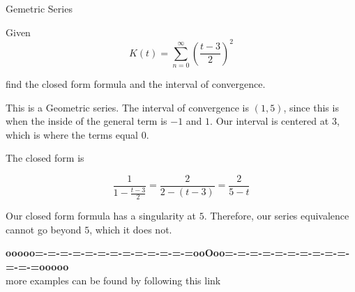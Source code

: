 \documentclass{ximera}
\begin{document}
\begin{example} Gemetric Series


Given 
\[    K(t) =   \sum_{n=0}^{\infty}  \left( \frac{t-3}{2} \right)^2\]

find the closed form formula and the interval of convergence.




\begin{explanation}


This is a Geometric series.  The interval of convergence is $(1, 5)$, since this is when the inside of the general term is $-1$ and $1$. Our interval is centered at $3$, which is where the terms equal $0$.


The closed form is

\[  \frac{1}{1 - \frac{t-3}{2}}  =     \frac{2}{2-(t-3)} =    \frac{2}{5-t}        \]



\end{explanation}


Our closed form formula has a singularity at $5$.  Therefore, our series equivalence cannot go beyond $5$, which it does not.




\begin{center}
\end{center}




\end{example}











\begin{center}
\textbf{\textcolor{green!50!black}{ooooo=-=-=-=-=-=-=-=-=-=-=-=-=ooOoo=-=-=-=-=-=-=-=-=-=-=-=-=ooooo}} \\

more examples can be found by following this link\\ 

\end{center}
\end{document}
